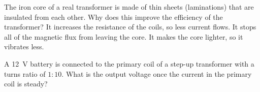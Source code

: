 \begin{quizq}{}
The iron core of a real transformer is made of thin sheets (laminations) that are insulated from each
other. Why does this improve the efficiency of the transformer?
  {It increases the resistance of the coils, so less current flows.}
  {It stops all of the magnetic flux from leaving the core.}
  {It makes the core lighter, so it vibrates less.}
\end{quizq}

\begin{quizq}{}
A \qty{12}{V} battery is connected to the primary coil of a step-up transformer with a turns ratio
of $1 : 10$. What is the output voltage once the current in the primary coil is steady?
\end{quizq}
